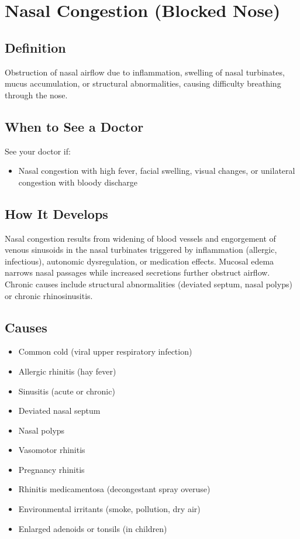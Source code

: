 \chapter{Nasal Congestion (Blocked Nose)}

\section*{Definition}
Obstruction of nasal airflow due to inflammation, swelling of nasal turbinates, mucus accumulation, or structural abnormalities, causing difficulty breathing through the nose.

\section*{When to See a Doctor}
See your doctor if:
\begin{itemize}
  \item Nasal congestion with high fever, facial swelling, visual changes, or unilateral congestion with bloody discharge
\end{itemize}

\section*{How It Develops}
Nasal congestion results from widening of blood vessels and engorgement of venous sinusoids in the nasal turbinates triggered by inflammation (allergic, infectious), autonomic dysregulation, or medication effects. Mucosal edema narrows nasal passages while increased secretions further obstruct airflow. Chronic causes include structural abnormalities (deviated septum, nasal polyps) or chronic rhinosinusitis.

\section*{Causes}
\begin{itemize}
  \item Common cold (viral upper respiratory infection)
  \item Allergic rhinitis (hay fever)
  \item Sinusitis (acute or chronic)
  \item Deviated nasal septum
  \item Nasal polyps
  \item Vasomotor rhinitis
  \item Pregnancy rhinitis
  \item Rhinitis medicamentosa (decongestant spray overuse)
  \item Environmental irritants (smoke, pollution, dry air)
  \item Enlarged adenoids or tonsils (in children)
\end{itemize}


